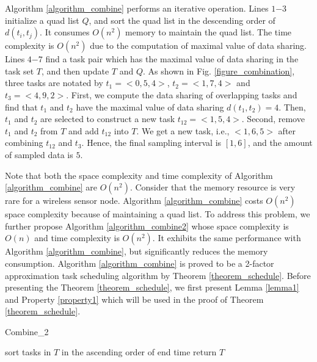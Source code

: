\documentclass[prodmode,acmtosn]{acmsmall}
\begin{document}
Algorithm \ref{algorithm_combine} performs an iterative operation. Lines $1\mathrm{-}3$ initialize a quad list $Q$, and sort the quad list in the descending order of $d(t_i,t_j)$. It consumes $O(n^2)$ memory to maintain the quad list. The time complexity is $O(n^2)$ due to the computation of  maximal value of data sharing. Lines $4\mathrm{-}7$  find a task pair which has the maximal value of data sharing in the task set $T$, and then update $T$ and $Q$.  As shown in Fig. \ref{figure_combination}, three tasks are notated by $t_1\mathrm{=<}0,5,4\mathrm{>}$, $t_2\mathrm{=<}1,7,4\mathrm{>}$ and $t_3\mathrm{=<}4,9,2\mathrm{>}$. First, we compute the data sharing of overlapping tasks and find that $t_1$ and $t_2$ have the maximal value of data sharing $d(t_1,t_2)\mathrm{=}4$. Then, $t_1$ and $t_2$ are selected to construct a new task $t_{12}\mathrm{=<}1,5,4\mathrm{>}$. Second, remove $t_1$ and $t_2$ from $T$ and add $t_{12}$ into $T$.  We get a new task, i.e., $\mathrm{<}1,6,5\mathrm{>}$ after combining $t_{12}$ and $t_3$. Hence, the final sampling interval is $[1,6]$, and the amount of sampled data is $5$.



Note that both the space complexity and time complexity of Algorithm \ref{algorithm_combine} are $O(n^2)$. Consider that the memory resource is very rare for a wireless sensor node. Algorithm \ref{algorithm_combine} costs $O(n^2)$ space complexity because of maintaining a quad list. To address this problem, we further propose Algorithm \ref{algorithm_combine2} whose space complexity is $O(n)$ and time complexity is $O(n^2)$.  It exhibits the same performance with Algorithm \ref{algorithm_combine}, but significantly reduces the memory consumption. Algorithm \ref{algorithm_combine} is proved to be a 2-factor approximation task scheduling algorithm by Theorem \ref{theorem_schedule}. Before presenting the Theorem \ref{theorem_schedule}, we first present Lemma \ref{lemma1} and Property \ref{property1} which will be used in the proof of Theorem \ref{theorem_schedule}.

\begin{algorithm}[t]
	\SetAlgoNoLine
    \caption{Combine\_2}
    \label{algorithm_combine2}
        sort tasks in $T$ in the ascending order of end time\;
        return $T$\;
\end{algorithm}
\end{document}
